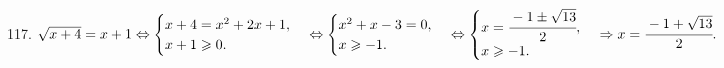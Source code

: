 117. $\sqrt{x+4}=x+1\Leftrightarrow\begin{cases} x+4=x^2+2x+1,\\ x+1\geqslant0.\end{cases}\Leftrightarrow\begin{cases} x^2+x-3=0,\\ x\geqslant-1.\end{cases}\Leftrightarrow\begin{cases} x=\cfrac{-1\pm\sqrt{13}}{2},\\ x\geqslant-1.\end{cases}\Rightarrow x=\cfrac{-1+\sqrt{13}}{2}.$\\
